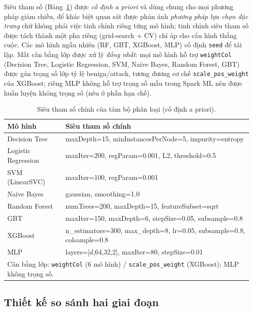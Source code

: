 \documentclass[runningheads]{llncs}
\begin{document}
Siêu tham số (Bảng~\ref{tab:hparams}) được \emph{cố định a priori} và dùng chung cho mọi phương pháp giảm chiều, để khác biệt quan sát được phản ánh \emph{phương pháp lựa chọn đặc trưng} chứ không phải việc tinh chỉnh riêng từng mô hình; tinh chỉnh siêu tham số được tách thành một pha riêng (grid-search + CV) chỉ áp cho cấu hình thắng cuộc. Các mô hình ngẫu nhiên (RF, GBT, XGBoost, MLP) cố định \texttt{seed} để tái lập. Mất cân bằng lớp được xử lý \emph{đồng nhất}: mọi mô hình hỗ trợ \texttt{weightCol} (Decision Tree, Logistic Regression, SVM, Naive Bayes, Random Forest, GBT) được gán trọng số lớp tỷ lệ benign/attack, tương đương cơ chế \texttt{scale\_pos\_weight} của XGBoost; riêng MLP không hỗ trợ trọng số mẫu trong Spark ML nên được huấn luyện không trọng số (nêu ở phần hạn chế).

\begin{table}[htbp]
  \caption{Siêu tham số chính của tám bộ phân loại (cố định a priori).}
  \label{tab:hparams}
  \centering
  \small
  \begin{tabular}{ll}
    \toprule
    Mô hình & Siêu tham số chính \\
    \midrule
    Decision Tree & maxDepth=15, minInstancesPerNode=5, impurity=entropy \\
    Logistic Regression & maxIter=200, regParam=0.001, L2, threshold=0.5 \\
    SVM (LinearSVC) & maxIter=100, regParam=0.001 \\
    Naive Bayes & gaussian, smoothing=1.0 \\
    Random Forest & numTrees=200, maxDepth=15, featureSubset=sqrt \\
    GBT & maxIter=150, maxDepth=6, stepSize=0.05, subsample=0.8 \\
    XGBoost & n\_estimators=300, max\_depth=8, lr=0.05, subsample=0.8, colsample=0.8 \\
    MLP & layers=[$d$,64,32,2], maxIter=80, stepSize=0.01 \\
    \midrule
    \multicolumn{2}{l}{Cân bằng lớp: \texttt{weightCol} (6 mô hình) / \texttt{scale\_pos\_weight} (XGBoost); MLP không trọng số.} \\
    \bottomrule
  \end{tabular}
\end{table}

\subsection{Thiết kế so sánh hai giai đoạn}
\end{document}
